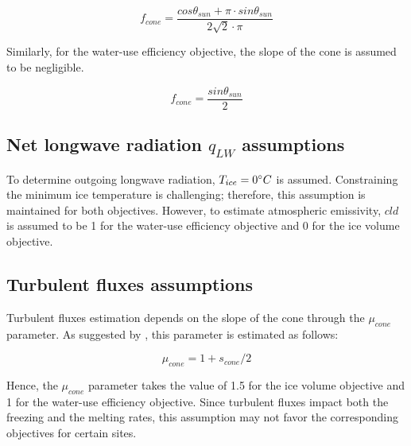 \begin{equation}
		f_{cone} =\frac{ cos \theta_{sun} + \pi \cdot sin \theta_{sun} }{2\sqrt{2} \cdot \pi }
\end{equation}

Similarly, for the water-use efficiency objective, the slope of the cone is assumed to be negligible.

\begin{equation}
		f_{cone} =\frac{ sin \theta_{sun} }{2 }
\end{equation}

\subsection{Net longwave radiation \texorpdfstring{$q_{LW}$}{Lg} assumptions} 

To determine outgoing longwave radiation, $T_{ice} = 0 ^{\circ} C$ is assumed. Constraining the minimum ice
temperature is challenging; therefore, this assumption is maintained for both objectives. However, to
estimate atmospheric emissivity, $cld$ is assumed to be 1 for the water-use efficiency objective and 0 for the ice volume
objective.

\subsection{Turbulent fluxes assumptions} 

Turbulent fluxes estimation depends on the slope of the cone through the $\mu_{cone}$ parameter. As suggested 
by \citet{oerlemansBriefCommunicationGrowth2021}, this parameter is estimated as follows:

\begin{equation}
  \mu_{cone} =1 + s_{cone}/2
\end{equation}

Hence, the $\mu_{cone}$ parameter takes the value of 1.5 for the ice volume objective and 1 for the water-use efficiency
objective. Since turbulent fluxes impact both the freezing and the melting rates, this assumption
may not favor the corresponding objectives for certain sites.
